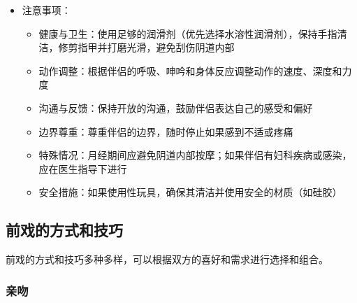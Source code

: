 \documentclass[12pt,UTF8]{ctexbook}
\begin{document}
\begin{itemize}
\begin{itemize}
\begin{itemize}
\begin{itemize}
      \item 旋转式按摩：用手指在阴道内做顺时针和逆时针的旋转运动，刺激更多的敏感神经
      \item 压力变化：在按摩过程中交替使用轻压和重压，创造变化的刺激感
      \item 温度变化：可以尝试用温水浸泡过的手指或性玩具进行刺激，增加温度变化的快感
      \end{itemize}
    \item \textbf{多部位协同刺激}：
      \begin{itemize}
      \item 阴蒂+G点：用一只手按摩阴蒂，另一只手插入阴道按摩G点，保持节奏同步
      \item 阴蒂+肛门：用一只手按摩阴蒂，另一只手轻轻按摩肛门周围
      \item 阴蒂+乳头：用一只手按摩阴蒂，另一只手抚摸或捏揉乳头
      \item 多重手指刺激：使用两根手指插入阴道，一根刺激G点，另一根刺激阴道壁其他区域
      \end{itemize}
    \end{itemize}
  \item 注意事项：
    \begin{itemize}
    \item 健康与卫生：使用足够的润滑剂（优先选择水溶性润滑剂），保持手指清洁，修剪指甲并打磨光滑，避免刮伤阴道内部
    \item 动作调整：根据伴侣的呼吸、呻吟和身体反应调整动作的速度、深度和力度
    \item 沟通与反馈：保持开放的沟通，鼓励伴侣表达自己的感受和偏好
    \item 边界尊重：尊重伴侣的边界，随时停止如果感到不适或疼痛
    \item 特殊情况：月经期间应避免阴道内部按摩；如果伴侣有妇科疾病或感染，应在医生指导下进行
    \item 安全措施：如果使用性玩具，确保其清洁并使用安全的材质（如硅胶）
    \end{itemize}
  \end{itemize}
\end{itemize}

\subsection{前戏的方式和技巧}

前戏的方式和技巧多种多样，可以根据双方的喜好和需求进行选择和组合。

\subsubsection{亲吻}
\end{document}
